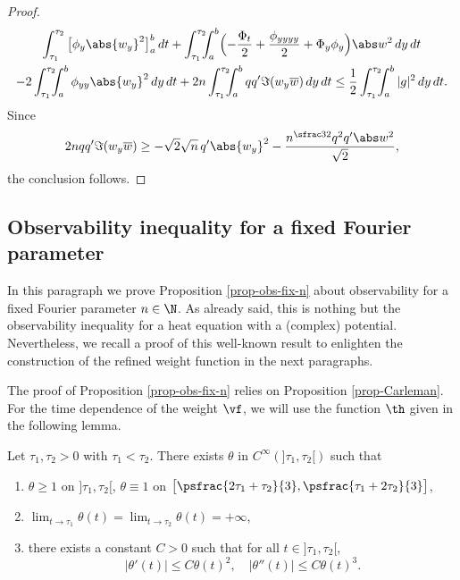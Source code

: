 \begin{proof}
\begin{multline*}
\int_{\tau_1}^{\tau_2} \big[ \phi_y \abs{w_y}^2 \big]_a^b \, dt + \int_{\tau_1}^{\tau_2}\hspace*{-2mm} \int_a^b \Bigl(- \frac {\Phi_t}2 + \frac { \phi_{yyyy}}2 + \Phi_y \phi_y \Bigr) \abs w^2 \, dy \, dt \\
- 2 \int_{\tau_1}^{\tau_2}\hspace*{-2mm} \int_a^b \phi_{yy} \abs{w_y}^2 \, dy \, dt + 2n \int_{\tau_1}^{\tau_2}\hspace*{-2mm} \int_a^b qq' \Im(w_y \overline w) \, dy \, dt \leq \frac 12 \int_{\tau_1}^{\tau_2}\hspace*{-2mm} \int_a^b |g|^2 \, dy \, dt.
\end{multline*}
Since
\[
2n qq' \Im(w_y \overline w) \geq - \sqrt 2 \sqrt n\,q' \abs{w_y}^2 - \frac { n^{\sfrac 32} q^2 q' \abs w^2} {\sqrt 2},
\]
the conclusion follows.
\end{proof}

\subsection{Observability inequality for a fixed Fourier parameter} \label{sec-obs-fixed-n}

In this paragraph we prove Proposition \ref{prop-obs-fix-n} about observability for a fixed Fourier parameter $n \in \N$. As already said, this is nothing but the observability inequality for a heat equation with a (complex) potential. Nevertheless, we recall a proof of this well-known result to enlighten the construction of the refined weight function in the next paragraphs.

The proof of Proposition \ref{prop-obs-fix-n} relies on Proposition \ref{prop-Carleman}. For the time dependence of the weight $\vf$, we will use the function $\th$ given in the following lemma.

\begin{lemma} \label{lemma_def_theta}
Let $\tau_1,\tau_2 > 0$ with $\tau_1<\tau_2$. There exists $\theta$ in $C^\infty(]\tau_1,\tau_2[)$ such that
\begin{enumerate}
\item $\theta \geq 1$ on $]\tau_1,\tau_2[$, $\theta \equiv 1$ on $\big[\psfrac{2\tau_1 + \tau_2}{3},\psfrac{\tau_1 + 2\tau_2}{3} \big]$,
\item $\lim_{t \rightarrow \tau_1} \theta(t) = \lim_{t \rightarrow \tau_2} \theta(t)= + \infty$,
\item there exists a constant $C>0$ such that for all $t \in{}]\tau_1,\tau_2[$,
\[
\vert \theta'(t) \vert \leq C \theta(t)^2, \quad \vert \theta''(t) \vert \leq C \theta(t)^3.
\]
\end{enumerate}
\end{lemma}

